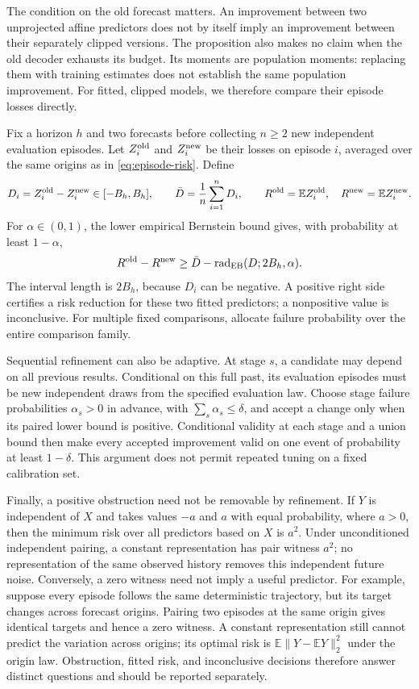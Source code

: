 The condition on the old forecast matters. An improvement between two
unprojected affine predictors does not by itself imply an improvement
between their separately clipped versions. The proposition also makes no
claim when the old decoder exhausts its budget. Its moments are population
moments: replacing them with training estimates does not establish the
same population improvement. For fitted, clipped models, we therefore
compare their episode losses directly.

Fix a horizon $h$ and two forecasts before collecting $n\geq2$ new
independent evaluation episodes. Let $Z_i^{\rm old}$ and
$Z_i^{\rm new}$ be their losses on episode $i$, averaged over the same
origins as in \eqref{eq:episode-risk}. Define
\[
 D_i=Z_i^{\rm old}-Z_i^{\rm new}\in[-B_h,B_h],\qquad
 \bar D=\frac1n\sum_{i=1}^nD_i,\qquad
 R^{\rm old}=\mathbb EZ_i^{\rm old},\quad
 R^{\rm new}=\mathbb EZ_i^{\rm new}.
\]
For $\alpha\in(0,1)$, the lower empirical Bernstein bound gives, with
probability at least $1-\alpha$,
\begin{equation}
 R^{\rm old}-R^{\rm new}\geq
 \bar D-\operatorname{rad}_{\rm EB}(D;2B_h,\alpha).
 \label{eq:paired-improvement}
\end{equation}
The interval length is $2B_h$, because $D_i$ can be negative. A positive
right side certifies a risk reduction for these two fitted predictors;
a nonpositive value is inconclusive. For multiple fixed comparisons,
allocate failure probability over the entire comparison family.

Sequential refinement can also be adaptive. At stage $s$, a candidate may
depend on all previous results. Conditional on this full past, its evaluation
episodes must be new independent draws from the specified evaluation law.
Choose stage failure probabilities $\alpha_s>0$ in advance, with
$\sum_s\alpha_s\leq\delta$, and accept
a change only when its paired lower bound is positive. Conditional validity
at each stage and a union bound then make every accepted improvement valid
on one event of probability at least $1-\delta$. This argument does not
permit repeated tuning on a fixed calibration set.

Finally, a positive obstruction need not be removable by refinement. If
$Y$ is independent of $X$ and takes values $-a$ and $a$ with equal
probability, where $a>0$, then the minimum risk over all predictors based
on $X$ is $a^2$. Under unconditioned independent pairing, a constant
representation has pair witness $a^2$; no representation of the same
observed history removes this independent future noise. Conversely, a zero
witness need not imply a useful predictor. For example, suppose every
episode follows the same deterministic trajectory,
but its target changes across forecast origins. Pairing two episodes at the
same origin gives identical targets and hence a zero witness. A constant
representation still cannot predict the variation across origins; its optimal
risk is $\mathbb E\|Y-\mathbb EY\|_2^2$ under the origin law.
Obstruction, fitted risk, and inconclusive decisions therefore answer
distinct questions and should be reported separately.
